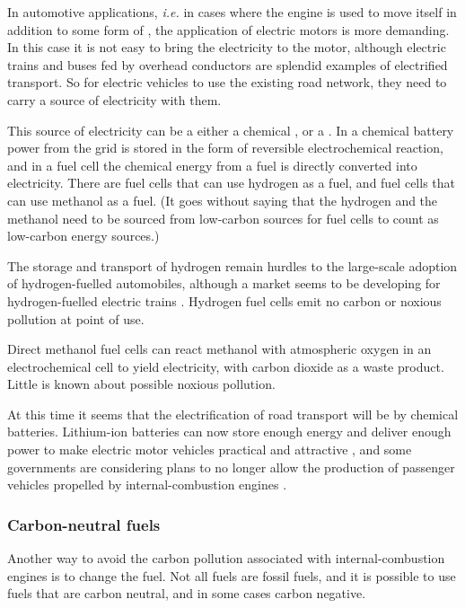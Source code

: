In automotive applications, \textit{i.e.} in cases where the engine is used to
move itself in addition to some form of , the application of
electric motors is more demanding. In this case it is not easy to bring the
electricity to the motor, although electric trains and buses fed by overhead
conductors are splendid examples of electrified transport. So for electric
vehicles to use the existing road network, they need to carry a source of
electricity with them.

This source of electricity can be a either a chemical ,
or a . In a chemical battery power from the grid is stored in
the form of reversible electrochemical reaction, and in a fuel cell the chemical
energy from a fuel is directly converted into electricity. There are fuel cells
that can use hydrogen as a fuel, and fuel cells that can use methanol as a fuel.
(It goes without saying that the hydrogen and the methanol need to be sourced
from low-carbon sources for fuel cells to count as low-carbon energy sources.)

The storage and transport of hydrogen remain hurdles to the large-scale adoption
of hydrogen-fuelled automobiles, although a market seems to be developing for
hydrogen-fuelled electric trains \autocite{theguardian_2018}. Hydrogen fuel cells
emit no carbon or noxious pollution at point of use.

Direct methanol fuel cells can react methanol with atmospheric oxygen in an
electrochemical cell to yield electricity, with carbon dioxide
as a waste product. Little is known about possible noxious pollution.

At this time it seems that the electrification of road transport will be by
chemical batteries. Lithium-ion batteries can now store enough energy and
deliver enough power to make electric motor vehicles practical and attractive
\autocite{Hayes2011}, and some governments are considering plans to no longer
allow the production of passenger vehicles propelled by internal-combustion
engines \autocite{Burke-Kennedy2018, Reuters2018, Gabbatiss2018}.

\subsubsection{Carbon-neutral fuels} 

Another way to avoid the carbon pollution associated with internal-combustion
engines is to change the fuel. Not all fuels are fossil fuels, and it is
possible to use fuels that are carbon neutral, and in some cases carbon
negative.

